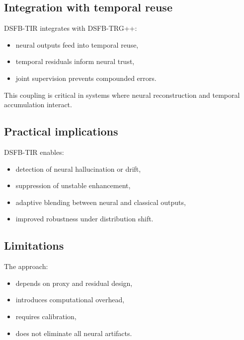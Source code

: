 \documentclass[11pt,letterpaper]{article}
\theoremstyle{gcresult}
\theoremstyle{definition}
\begin{document}

\subsection{Integration with temporal reuse}

DSFB-TIR integrates with DSFB-TRG++:
\begin{itemize}[leftmargin=1.5em]
    \item neural outputs feed into temporal reuse,
    \item temporal residuals inform neural trust,
    \item joint supervision prevents compounded errors.
\end{itemize}

This coupling is critical in systems where neural reconstruction and temporal accumulation interact.


\subsection{Practical implications}

DSFB-TIR enables:
\begin{itemize}[leftmargin=1.5em]
    \item detection of neural hallucination or drift,
    \item suppression of unstable enhancement,
    \item adaptive blending between neural and classical outputs,
    \item improved robustness under distribution shift.
\end{itemize}


\subsection{Limitations}

The approach:
\begin{itemize}[leftmargin=1.5em]
    \item depends on proxy and residual design,
    \item introduces computational overhead,
    \item requires calibration,
    \item does not eliminate all neural artifacts.
\end{itemize}
\end{document}
